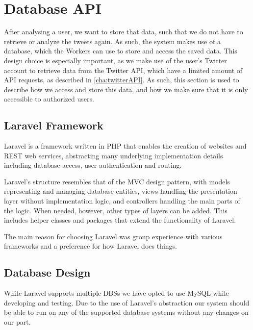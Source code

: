 \chapter{Database \acs{API}}\label{DatabaseAPI}
After analysing a user, we want to store that data, such that we do not have to
retrieve or analyze the tweets again. As such, the system makes use of a
database, which the Workers can use to store and access the saved data. This
design choice is especially important, as we make use of the user's Twitter
account to retrieve data from the Twitter \ac{API}, which have a limited amount
of API requests, as described in \autoref{cha:twitterAPI}. As such, this section
is used to describe how we access and store this data, and how we make sure that
it is only accessible to authorized users.\nl


\section{Laravel Framework}\label{sec:laravel}
Laravel is a framework written in PHP that enables the creation of websites and
\ac{REST} web services, abstracting many underlying implementation details
including database access, user authentication and routing.\nl

Laravel's structure resembles that of the \ac{MVC} design pattern, with models
representing and managing database entities, views handling the presentation
layer without implementation logic, and controllers handling the main parts of
the logic. When needed, however, other types of layers can be added. This
includes helper classes and packages that extend the functionality of
Laravel.\nl

The main reason for choosing Laravel was group experience with various
frameworks and a preference for how Laravel does things.

\section{Database Design}\label{DBDesign}
While Laravel supports multiple \acp{DBS} \citep{LaravelDBS} we have opted to
use MySQL while developing and testing. Due to the use of Laravel's abstraction our
system should be able to run on any of the supported database systems without
any changes on our part.\nl

